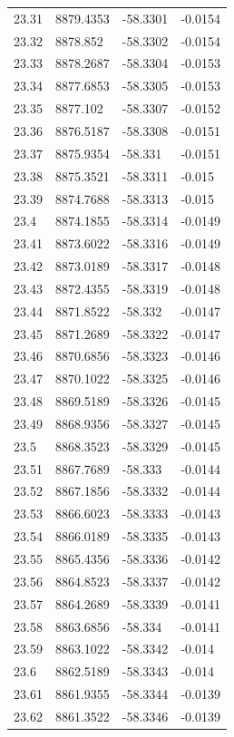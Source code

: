 \begin{table}[H]
\begin{tabular}{llll}
23.31 & 8879.4353 & -58.3301 & -0.0154 \\
23.32 & 8878.852 & -58.3302 & -0.0154 \\
23.33 & 8878.2687 & -58.3304 & -0.0153 \\
23.34 & 8877.6853 & -58.3305 & -0.0153 \\
23.35 & 8877.102 & -58.3307 & -0.0152 \\
23.36 & 8876.5187 & -58.3308 & -0.0151 \\
23.37 & 8875.9354 & -58.331 & -0.0151 \\
23.38 & 8875.3521 & -58.3311 & -0.015 \\
23.39 & 8874.7688 & -58.3313 & -0.015 \\
23.4 & 8874.1855 & -58.3314 & -0.0149 \\
23.41 & 8873.6022 & -58.3316 & -0.0149 \\
23.42 & 8873.0189 & -58.3317 & -0.0148 \\
23.43 & 8872.4355 & -58.3319 & -0.0148 \\
23.44 & 8871.8522 & -58.332 & -0.0147 \\
23.45 & 8871.2689 & -58.3322 & -0.0147 \\
23.46 & 8870.6856 & -58.3323 & -0.0146 \\
23.47 & 8870.1022 & -58.3325 & -0.0146 \\
23.48 & 8869.5189 & -58.3326 & -0.0145 \\
23.49 & 8868.9356 & -58.3327 & -0.0145 \\
23.5 & 8868.3523 & -58.3329 & -0.0145 \\
23.51 & 8867.7689 & -58.333 & -0.0144 \\
23.52 & 8867.1856 & -58.3332 & -0.0144 \\
23.53 & 8866.6023 & -58.3333 & -0.0143 \\
23.54 & 8866.0189 & -58.3335 & -0.0143 \\
23.55 & 8865.4356 & -58.3336 & -0.0142 \\
23.56 & 8864.8523 & -58.3337 & -0.0142 \\
23.57 & 8864.2689 & -58.3339 & -0.0141 \\
23.58 & 8863.6856 & -58.334 & -0.0141 \\
23.59 & 8863.1022 & -58.3342 & -0.014 \\
23.6 & 8862.5189 & -58.3343 & -0.014 \\
23.61 & 8861.9355 & -58.3344 & -0.0139 \\
23.62 & 8861.3522 & -58.3346 & -0.0139 \\

\end{tabular}
\end{table}
